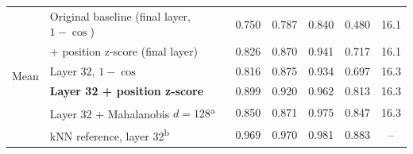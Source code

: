 {\begin{tabular}{llccccc}
\multirow{6}{*}{Mean}
 & Original baseline (final layer, $1-\cos$) & 0.750 & 0.787 & 0.840 & 0.480 & 16.1 \\
 & + position z-score (final layer) & 0.826 & 0.870 & 0.941 & 0.717 & 16.1 \\
 & Layer 32, $1-\cos$ & 0.816 & 0.875 & 0.934 & 0.697 & 16.3 \\
 & \textbf{Layer 32 + position z-score} & 0.899 & 0.920 & 0.962 & 0.813 & 16.3 \\
 & Layer 32 + Mahalanobis $d{=}128$\textsuperscript{a} & 0.850 & 0.871 & 0.975 & 0.847 & 16.3 \\
 & kNN reference, layer 32\textsuperscript{b} & 0.969 & 0.970 & 0.981 & 0.883 & -- \\
\hline
\end{tabular}%
}

